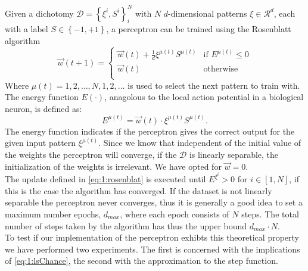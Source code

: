 Given a dichotomy $\mathcal{D} = \left\{\xi^i, S^i \right\}_{i}^{N}$ with $N$ $d$-dimensional patterns $\xi \in \mathcal{R}^d$, each with a label $S \in \left\{-1, +1 \right\}$, a perceptron can be trained using the Rosenblatt algorithm 
	\begin{equation}\label{eq:1:rosenblat}
		\vec{w}(t+1) = 
		\begin{cases}
		\vec{w}(t) + \frac{1}{d} \xi^{\mu(t)} S^{\mu(t)}
		& \text{if } E^{\mu(t)} \leq 0\\
		\vec{w}(t) 											
		& \text{otherwise}\\
		\end{cases}
	\end{equation}
Where $\mu(t) = 1, 2, \ldots, N, 1, 2, \ldots$ is used to select the next pattern to train with. The energy function $E(\cdot)$, anagolous to the local action potential in a biological neuron, is defined as:
	\begin{equation}\label{eq:1:energyFunction}
		E^{\mu(t)} = \vec{w}(t) \cdot \xi^{\mu(t)}S^{\mu(t)}.
	\end{equation}
The energy function indicates if the perceptron gives the correct output for the given input pattern $\xi^{\mu(t)}$. Since we know that independent of the initial value of the weights the perceptron will converge, if the $\mathcal{D}$ is linearly separable, the initialization of the weights is irrelevant. We have opted for $\vec{w} = 0$.\\

The update defined in \autoref{eq:1:rosenblat} is executed until $E^{\xi^i} > 0$ for $i \in [1, N]$, if this is the case the algorithm has converged. If the dataset is not linearly separable the perceptron never converges, thus it is generally a good idea to set a maximum number epochs, $d_{max}$, where each epoch consists of $N$ steps. The total number of steps taken by the algorithm has thus the upper bound $d_{max} \cdot N$. \\

To test if our implementation of the perceptron exhibts this theoretical property we have performed two experiments. The first is concerned with the implications of \autoref{eq:1:lsChance}, the second with the approximation to the step function.



